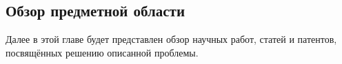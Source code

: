 \subsection{Обзор предметной области}
Далее в этой главе будет представлен обзор научных работ, статей и патентов, посвящённых решению описанной проблемы.







